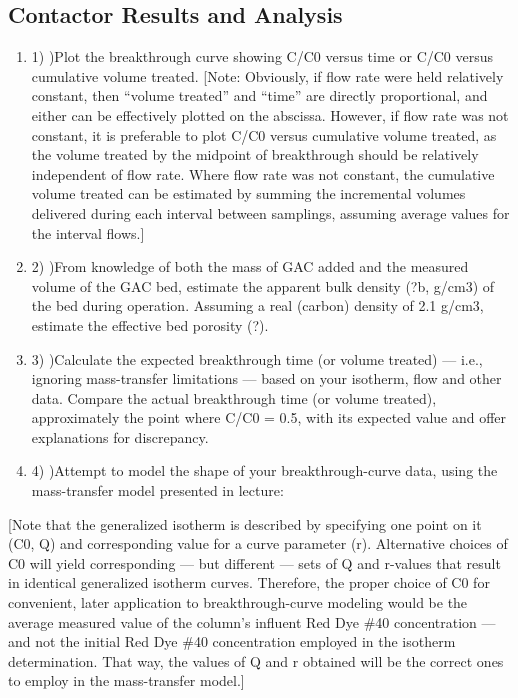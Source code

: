 \documentclass{article} %
\begin{document}
\noindent 
\subsection{Contactor Results and Analysis}

\noindent \begin{enumerate}
\item 1) )Plot the breakthrough curve showing C/C0 versus time or C/C0 versus cumulative volume treated. [Note: Obviously, if flow rate were held relatively constant, then ``volume treated'' and ``time'' are directly proportional, and either can be effectively plotted on the abscissa. However, if flow rate was not constant, it is preferable to plot C/C0 versus cumulative volume treated, as the volume treated by the midpoint of breakthrough should be relatively independent of flow rate. Where flow rate was not constant, the cumulative volume treated can be estimated by summing the incremental volumes delivered during each interval between samplings, assuming average values for the interval flows.]

\noindent \item 2) )From knowledge of both the mass of GAC added and the measured volume of the GAC bed, estimate the apparent bulk density (?b, g/cm3) of the bed during operation. Assuming a real (carbon) density of 2.1 g/cm3, estimate the effective bed porosity (?).

\noindent \item 3) )Calculate the expected breakthrough time (or volume treated) --- i.e., ignoring mass-transfer limitations --- based on your isotherm, flow and other data. Compare the actual breakthrough time (or volume treated), approximately the point where C/C0 = 0.5, with its expected value and offer explanations for discrepancy.

\noindent \item 4) )Attempt to model the shape of your breakthrough-curve data, using the mass-transfer model presented in lecture: 
\end{enumerate}

[Note that the generalized isotherm is described by specifying one point on it (C0, Q) and corresponding value for a curve parameter (r). Alternative choices of C0 will yield corresponding --- but different --- sets of Q and r-values that result in identical generalized isotherm curves. Therefore, the proper choice of C0 for convenient, later application to breakthrough-curve modeling would be the average measured value of the column's influent Red Dye \#40 concentration --- and not the initial Red Dye \#40 concentration employed in the isotherm determination. That way, the values of Q and r obtained will be the correct ones to employ in the mass-transfer model.]
\end{document}
